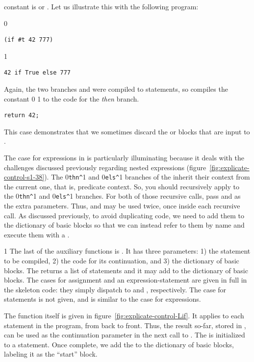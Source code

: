\documentclass[7x10]{TimesAPriori_MIT}%
\def\racketEd{0}
\def\pythonEd{1}
\def\edition{1}
\newcommand{\racket}[1]{{\if\edition\racketEd{#1}\fi}}
\newcommand{\pythonColor}[0]{}
\newcommand{\python}[1]{{\if\edition\pythonEd\pythonColor #1\fi}}
\numberwithin{theorem}{chapter}
\numberwithin{definition}{chapter}
\numberwithin{equation}{chapter}
\begin{document}
constant is \TRUE{} or \FALSE{}. Let us illustrate this with the
following program:
{\if\edition\racketEd
\begin{lstlisting}
(if #t 42 777)
\end{lstlisting}
\fi}
{\if\edition\pythonEd\pythonColor
\begin{lstlisting}
42 if True else 777
\end{lstlisting}
\fi}
%
\noindent Again, the two branches  and  were
compiled to  statements, so 
compiles the constant \racket{} \python{} to the
code for the \emph{then} branch.
\begin{lstlisting}
return 42;
\end{lstlisting}
This case demonstrates that we sometimes discard the  or
 blocks that are input to .

The case for  expressions in  is
particularly illuminating because it deals with the challenges
discussed previously regarding nested  expressions
(figure~\ref{fig:explicate-control-s1-38}).  The
\racket{\lstinline{thn^}}\python{} and
\racket{\lstinline{els^}}\python{} branches of the
 inherit their context from the current one, that is,
predicate context. So, you should recursively apply
 to the
\racket{\lstinline{thn^}}\python{} and
\racket{\lstinline{els^}}\python{} branches. For both of
those recursive calls, pass  and  as the extra
parameters. Thus,  and  may be used twice, once
inside each recursive call. As discussed previously, to avoid
duplicating code, we need to add them to the dictionary of basic
blocks so that we can instead refer to them by name and execute them
with a .

{\if\edition\pythonEd\pythonColor
%
The last of the auxiliary functions is .  It has
three parameters: 1) the statement to be compiled, 2) the code for its
continuation, and 3) the dictionary of basic blocks. The
 returns a list of statements and it may add to
the dictionary of basic blocks. The cases for assignment and an
expression-statement are given in full in the skeleton code: they
simply dispatch to  and
, respectively. The case for 
statements is not given, and is similar to the case for 
expressions.

The  function itself is given in
figure~\ref{fig:explicate-control-Lif}. It applies
 to each statement in the program, from back to
front. Thus, the result so-far, stored in , can be
used as the continuation parameter in the next call to
. The  is initialized to a
 statement. Once complete, we add the  to
the dictionary of basic blocks, labeling it as the ``start'' block.
%
\fi}
\end{document}
